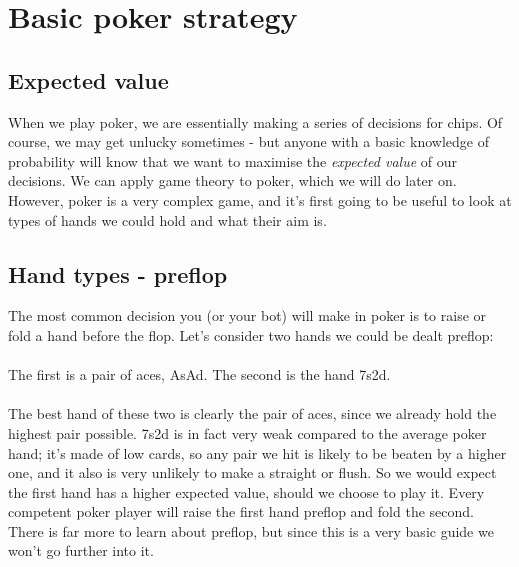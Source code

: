 \documentclass{article}
\begin{document}
\section{Basic poker strategy}
\subsection{Expected value}
When we play poker, we are essentially making a series of decisions for chips. Of course, we may get unlucky sometimes - but anyone with a basic knowledge of probability will know that we want to maximise the \emph{expected value} of our decisions. We can apply game theory to poker, which we will do later on. However, poker is a very complex game, and it's first going to be useful to look at types of hands we could hold and what their aim is.
\subsection{Hand types - preflop}
The most common decision you (or your bot) will make in poker is to raise or fold a hand before the flop. Let's consider two hands we could be dealt preflop:\\\\
The first is a pair of aces, AsAd. \newline 
The second is the hand 7s2d. \\\\ 
The best hand of these two is clearly the pair of aces, since we already hold the highest pair possible. 7s2d is in fact very weak compared to the average poker hand; it's made of low cards, so any pair we hit is likely to be beaten by a higher one, and it also is very unlikely to make a straight or flush. So we would expect the first hand has a higher expected value, should we choose to play it. Every competent poker player will raise the first hand preflop and fold the second. There is far more to learn about preflop, but since this is a very basic guide we won't go further into it.
\end{document}
